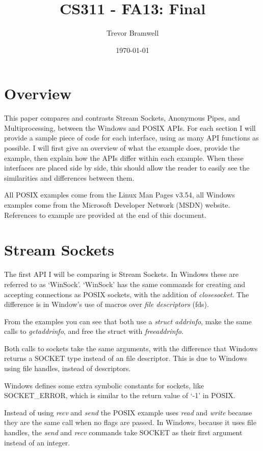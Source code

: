 \documentclass[letterpaper,10pt]{article}
\title{CS311 - FA13: Final}
\date{\today}
\author{Trevor Bramwell}
\begin{document}
\maketitle

\section*{Overview}

This paper compares and contrasts Stream Sockets, Anonymous Pipes, and
Multiprocessing, between the Windows and POSIX APIs. For each section I
will provide a sample piece of code for each interface, using as many
API functions as possible. I will first give an overview of what the
example does, provide the example, then explain how the APIs differ
within each example. When these interfaces are placed side by side, this
should allow the reader to easily see the similarities and differences
between them.

All POSIX examples come from the Linux Man Pages v3.54, all Windows
examples come from the Microsoft Developer Network (MSDN) website.
References to example are provided at the end of this document.

\section{Stream Sockets}

The first API I will be comparing is Stream Sockets. In Windows these are
referred to as `WinSock'. `WinSock' has the same commands for
creating and accepting connections as POSIX sockets, with the addition
of \emph{closesocket}. The difference is in Window's use of macros over
\emph{file descriptors} (fds).




From the examples you can see that both use a \emph{struct addrinfo},
make the same calls to \emph{getaddrinfo}, and free the struct with
\emph{freeaddrinfo}.

Both calls to sockets take the same arguments, with the difference that
Windows returns a SOCKET type instead of an file descriptor. This is due
to Windows using file handles, instead of descriptors.

Windows defines some extra symbolic constants for sockets, like
SOCKET\_ERROR, which is similar to the return value of `-1' in POSIX.

Instead of using \emph{recv} and \emph{send} the POSIX example uses
\emph{read} and \emph{write} because they are the same call when no
flags are passed. In Windows, because it uses file handles, the
\emph{send} and \emph{recv} commands take SOCKET as their first argument
instead of an integer.
\end{document}
